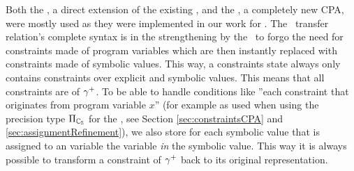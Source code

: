 Both the \symbolicValueAnalysisCPA, a direct extension of the existing ,
and the \constraintsCPA, a completely new CPA, were mostly used as they were implemented in our work for \cite{Lemberger2015}.
The \constraintsCPA\ transfer relation's complete syntax is in the strengthening by the \symbolicValueAnalysisCPA\ to forgo the need for constraints made of program variables which are then instantly replaced with constraints made of symbolic values.
This way, a constraints state always only contains constraints over explicit and symbolic values. This means that all constraints are of ${\gamma^+}$.
To be able to handle conditions like ''each constraint that originates from program variable $x$'' (for example as used when using the precision type $\Pi_{\mathbb{C_{S}}}$ for the \constraintsCPA, see Section \ref{sec:constraintsCPA} and \ref{sec:assignmentRefinement}),
we also store for each symbolic value that is assigned to an variable the variable \emph{in} the symbolic value.
This way it is always possible to transform a constraint of ${\gamma^+}$ back to its original representation.